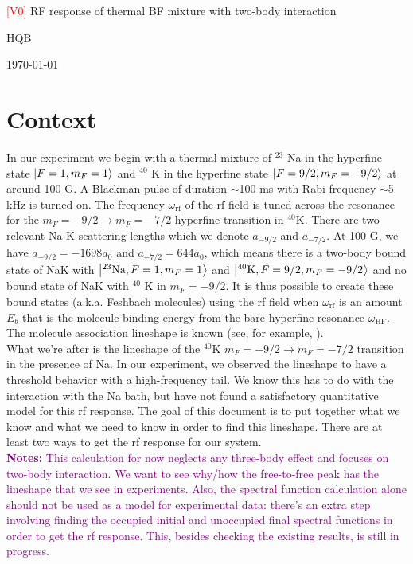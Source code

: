 \documentclass{article}
\theoremstyle{definition}
\begin{document}
\begin{center}
	\Large{\textcolor{red}{[V0]} RF response of thermal BF mixture with two-body interaction}
\end{center}	

\begin{center}
HQB
\end{center}

\begin{center}
	\today
\end{center}

\section{Context}

In our experiment we begin with a thermal mixture of $^{23}$ Na in the hyperfine state $\ket{F=1, m_F=1}$ and $^{40}$ K in the hyperfine state $\ket{F=9/2, m_F = -9/2}$ at around 100 G. A Blackman pulse of duration $\sim$100 ms with Rabi frequency $\sim$5 kHz is turned on. The frequency $\omega_\text{rf}$ of the rf field is tuned across the resonance for the $m_F = -9/2 \to m_F = -7/2$ hyperfine transition in $^{40}$K. There are two relevant Na-K scattering lengths which we denote $a_{-9/2}$ and $a_{-7/2}$. At 100 G, we have $a_{-9/2} = -1698 a_0$ and $a_{-7/2} = 644 a_0$, which means there is a two-body bound state of NaK with  $\ket{^{23}\text{Na}, F=1, m_F=1}$ and $\ket{^{40} \text{K}, F=9/2, m_F = -9/2}$ and no bound state of NaK with $^{40}$ K in $m_F = -9/2$. It is thus possible to create these bound states (a.k.a. Feshbach molecules) using the rf field when $\omega_\text{rf}$ is an amount $E_b$ that is the molecule binding energy from the bare hyperfine resonance $\omega_\text{HF}$. The molecule association lineshape is known (see, for example, \cite{FB_rf_1}). \\

\noindent What we're after is the lineshape of the $^{40}$K $m_F = -9/2 \to m_F = -7/2$ transition in the presence of Na. In our experiment, we observed the lineshape to have a threshold behavior with a high-frequency tail. We know this has to do with the interaction with the Na bath, but have not found a satisfactory quantitative model for this rf response. The goal of this document is to put together what we know and what we need to know in order to find this lineshape. There are at least two ways to get the rf response for our system.\\

\noindent \textcolor{purple}{\textbf{Notes:}  This calculation for now neglects any three-body effect and focuses on two-body interaction. We want to see why/how the free-to-free peak has the lineshape that we see in experiments. Also, the spectral function calculation alone should not be used as a model for experimental data: there's an extra step involving finding the occupied initial and unoccupied final spectral functions in order to get the rf response. This, besides checking the existing results, is still in progress. }\\
\end{document}
